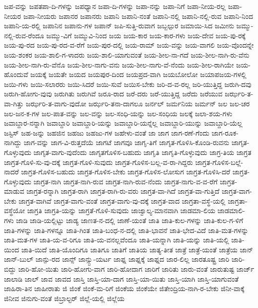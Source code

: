 {ಜಪ-ವನ್ನು
ಜಪತಪಾ-ದಿ-ಗಳನ್ನು
ಜಪಧ್ಯಾನ
ಜಪಾ-ದಿ-ಗಳನ್ನು
ಜಪಾ-ನನ್ನು
ಜಪಾ-ನಿಗೆ
ಜಪಾ-ನೀಯ-ರಲ್ಲ
ಜಪಾ-ನೀಯರ
ಜಪಾ-ನೀಯರು
ಜಪಾನರ
ಜಪಾನರು
ಜಪಾನಿ
ಜಪಾನಿ-ನಂತೆ
ಜಪಾನಿ-ನಲ್ಲಿ
ಜಪಾನಿ-ನಲ್ಲಿ-ರುವ
ಜಪಾನಿ-ನಿಂದ
ಜಪಾನಿ-ಯ-ರಲ್ಲಿ
ಜಪಾನಿನ
ಜಪಾನು-ಗಳ
ಜಪಾನ್
ಜಪಿ-ಸುತ್ತಿ-ರುವಾಗ
ಜಬ್ಬಲ್ಪುರ
ಜಮಾಯಿ-ಸಿದ
ಜಮೀನು
ಜಮ್ಮು-ನಲ್ಲಿ-ರುವ-ರೆಂದೂ
ಜಮ್ಮು-ವಿಗೆ
ಜಮ್ಮುವಿ-ನಿಂದ
ಜಯ
ಜಯ-ಕಾರ
ಜಯ-ಕಾರ-ಗಳು
ಜಯ-ದೇವ
ಜಯ-ಪು-ರಕ್ಕೆ
ಜಯ-ಪು-ರದ
ಜಯ-ಪು-ರದ-ವ-ರೆಗೆ
ಜಯ-ಪುರ-ದಲ್ಲಿ
ಜಯ-ರಾಮ್
ಜಯ-ವನ್ನು
ಜಯ-ವಾಗಲಿ
ಜಯ-ವೊಂದನ್ನೇ
ಜಯ-ಶಂಕರ
ಜಯ-ಶಾಲಿ-ಗ-ಳಾದರು
ಜಯ-ಶಾಲಿ-ಯಾಗುವಂತೆ
ಜಯ-ಶೀಲ-ನಾ-ಗದೆ
ಜಯ-ಶೀಲ-ನಾಗಿ-ರು-ವೆನು
ಜಯ-ಶೀಲ-ನಾಗಿ-ರು-ವೆನೊ
ಜಯ-ಶೀಲ-ನಾಗು-ವನು
ಜಯ-ಶೀಲ-ನಾಗು-ವೆ-ನೆಂದು
ಜಯ-ಶೀಲ-ರಾಗಿಯೇ
ಜಯ-ಹೊಂದುವೆ
ಜಯಕ್ಕೆ
ಜಯತೇ
ಜಯದ
ಜಯಪುರ-ದಿಂದ
ಜಯಪ್ರದ-ವಾಗಿ
ಜಯಬೋಲೋ
ಜಯಾಪಜಯ-ಗಳಲ್ಲಿ
ಜಯಿ-ಗಳು
ಜಯಿ-ಸಲಾರರು
ಜಯಿ-ಸಿದರೆ
ಜಯಿ-ಸುವೆ
ಜಯಿಸ-ಬೇಕು
ಜರಿ-ದ-ವ-ರಲ್ಲ
ಜರಿ-ಯುತ್ತಿದ್ದ
ಜರುಗಿ-ದವು
ಜರುಗಿ-ಹೋಗು-ವುವು
ಜರುಗಿತು
ಜರುಗಿವೆ
ಜರೂ-ರಾದ
ಜರೆ-ದರು
ಜರೆ-ಯುತ್ತಿದ್ದ
ಜರೆದು
ಜರೆಯುವ
ಜರ್ಝರಿ-ತ-ವಾ-ಗಿತ್ತು
ಜರ್ಝರಿ-ತ-ವಾಗು-ವುದೋ
ಜರ್ಝರಿ-ತನಾ-ದಾಗಲೂ
ಜರ್ನಲ್
ಜರ್ಮನಿಯ
ಜರ್ಮನ್
ಜಲ
ಜಲ-ಚರ
ಜಲ-ಜನ-ಕ-ಗಳ
ಜಲ-ಪಾತ-ವನ್ನು
ಜಲ-ವನ್ನು
ಜಲ-ಸಂಧಿ-ಯನ್ನು
ಜಲ-ಸಂಧಿಯ
ಜಲಕ್ಕೆ
ಜಲಾ-ಶಯ-ಗಳು
ಜವಾಬ್ದಾರ-ನನ್ನಾಗಿ
ಜವಾಬ್ದಾರಿ
ಜವಾಬ್ದಾರಿ-ಯನ್ನು
ಜವಾಬ್ದಾರಿ-ಯನ್ನೆಲ್ಲ
ಜವಾಬ್ದಾರಿ-ಯುನ್ನು
ಜವಾಬ್ದಾರಿ-ಯೆಲ್ಲ
ಜಸ್ಟಿಸ್
ಜಹ-ಜನ್ನು
ಜಹಜಿನ
ಜಹಜು
ಜಹಜು-ಗಳ
ಜಹೇಳು-ವಂತೆ
ಜಾ
ಜಾಗ
ಜಾಗ-ರಣೆ-ಗೆಂದು
ಜಾಗ-ರೂಕ-ನಾಗಿದ್ದು
ಜಾಗ-ವನ್ನು
ಜಾಗ-ವಿ-ರುತ್ತದೆಯೆ
ಜಾಗಟೆ
ಜಾಗವೂ
ಜಾಗೃ-ತಿಗೆ
ಜಾಗೃತ-ಗೊಳಿಸಿ-ಕೊಂಡಿ-ರುವನು
ಜಾಗೃತ-ಗೊಳ್ಳುವುದು
ಜಾಗೃತ-ವಾಗು-ವುದೆಂದು
ಜಾಗೃತಗೊಳಿಸ-ಬಹುದು
ಜಾಗೃತಿ
ಜಾಗೃತಿ-ಗೊಳ್ಳುವುದು
ಜಾಗ್ರ-ತಿಯ
ಜಾಗ್ರತ
ಜಾಗ್ರತ-ಗೊಳಿ-ಸು-ವು-ದಕ್ಕೆ
ಜಾಗ್ರತ-ಗೊಳಿ-ಸುವುದು
ಜಾಗ್ರತ-ಗೊಳಿಸ-ಬಲ್ಲ-ವ-ರಾ-ಗಿದ್ದರು
ಜಾಗ್ರತ-ಗೊಳಿಸ-ಬಲ್ಲೆ-ನಾದರೆ
ಜಾಗ್ರತ-ಗೊಳಿಸ-ಬಹುದು
ಜಾಗ್ರತ-ಗೊಳಿಸ-ಬೇಕು
ಜಾಗ್ರತ-ಗೊಳಿಸ-ಲೋಸುಗ
ಜಾಗ್ರತ-ಗೊಳಿಸಿ-ದರೆ
ಜಾಗ್ರತ-ಗೊಳ್ಳುವುದು
ಜಾಗ್ರತ-ನಾಗಿ
ಜಾಗ್ರತ-ನಾಗಿ-ರುವ
ಜಾಗ್ರತ-ನಾಗಿ-ರುವ-ನೆಂದು
ಜಾಗ್ರತ-ನಾಗು-ವ-ವ-ರೆಗೆ
ಜಾಗ್ರತ-ಮಾಡುವ
ಜಾಗ್ರತ-ರನ್ನಾಗಿ
ಜಾಗ್ರತ-ರಾಗಿ
ಜಾಗ್ರತ-ರಾಗಿ-ರು-ವರು
ಜಾಗ್ರತ-ವಾ-ಗಿದೆ
ಜಾಗ್ರತ-ವಾ-ಗುತ್ತಿದೆ
ಜಾಗ್ರತ-ವಾಗ-ಬೇಕು
ಜಾಗ್ರತ-ವಾಗಿವೆ
ಜಾಗ್ರತ-ವಾಗು-ವಂತೆ
ಜಾಗ್ರತ-ವಾಗು-ವು-ದಕ್ಕೆ
ಜಾಗ್ರತ-ವಾದ
ಜಾಗ್ರತಾ-ವಸ್ಥೆ-ಯಲ್ಲಿ
ಜಾಗ್ರತಾ-ವಸ್ಥೆಯೋ
ಜಾಗ್ರತಿ
ಜಾಗ್ರತಿ-ಯನ್ನು
ಜಾಗ್ರತೆ-ಗೊಳಿ-ಸುವುದು
ಜಾಜ್ವಾಲ್ಯ-ಮಾನವಾಗಿ
ಜಾಡಮಾ-ಲಿಯ
ಜಾಡಮಾಲಿ-ಗಳು
ಜಾಡಿ
ಜಾಡಿ-ಯಲ್ಲಿಟ್ಟು
ಜಾಡ್ಯ
ಜಾಣತ-ನ-ದಲ್ಲಿ
ಜಾಣೆ-ಯಂತೆ
ಜಾತಿ
ಜಾತಿ-ಕುಲ-ಗಳನ್ನು
ಜಾತಿ-ಕುಲ-ಗ-ಳಿಗೆ
ಜಾತಿ-ಗಳನ್ನು
ಜಾತಿ-ಗಳನ್ನೂ
ಜಾತಿ-ಗಿಂತ
ಜಾತಿ-ಬಂಧ-ನ-ದಲ್ಲಿ
ಜಾತಿ-ಭಾವನೆ
ಜಾತಿ-ಭೇದ-ವಿದೆ
ಜಾತಿ-ಮತ-ಗಳನ್ನು
ಜಾತಿ-ಮತ-ಗಳ
ಜಾತಿ-ಯ-ವ-ರಿಗೂ
ಜಾತಿ-ಯ-ವನಲ್ಲವೆಂದೂ
ಜಾತಿ-ಯನ್ನಾಗಿ
ಜಾತಿ-ಯನ್ನು
ಜಾತಿ-ಯಲ್ಲಿ
ಜಾತಿ-ಯಿಂದ
ಜಾತಿ-ಯಿದೆ
ಜಾತಿ-ಯೊಂದಿಗೂ
ಜಾತಿಗೂ
ಜಾತಿಗೆ
ಜಾತಿಯ
ಜಾತ್ಯ-ತೀತ
ಜಾತ್ರೆ
ಜಾತ್ರೆ-ಯಂತೆ
ಜಾತ್ರೆಯ
ಜಾನ್
ಜಾನ್-ಬುಲ್
ಜಾನ್ಪು-ರದ
ಜಾನ್ಸ್
ಜಾನ್ಸ್ಟು-ಯರ್ಟ
ಜಾಫ್ನ
ಜಾಫ್ನಕ್ಕೆ
ಜಾಫ್ನದ
ಜಾರ-ಲಿಲ್ಲ
ಜಾರತೂಷ್ಟ್ರ
ಜಾರಿ
ಜಾರಿ-ಬಿದ್ದು
ಜಾರಿ-ಹೋ-ಯಿತು
ಜಾರಿ-ಹೋಗು-ವಾಗ
ಜಾರಿ-ಹೋದಾಗ
ಜಾರಿಗೆ
ಜಾರಿತು
ಜಾರು-ವಂತೆ
ಜಾರುತುಷ್ಟ
ಜಾರ್ಜ್
ಜಾಲಾಡಿ
ಜಾಲ್
ಜಾವ
ಜಾವದ
ಜಾಸ್ತಿ
ಜಾಸ್ತಿ-ಯಾ-ದಾಗ
ಜಾಸ್ತಿ-ಯಾ-ಯಿತು
ಜಾಸ್ತಿ-ಯಾಗಿ
ಜಾಸ್ತಿ-ಯಾಗುವಂತೆ
ಜಾಹಿರಾ-ತಿನ
ಜಾಹೀರಾತು
ಜಿ
ಜಿಂಕೆ
ಜಿಂಕೆ-ಮ-ರಿಗೆ
ಜಿಂಕೆಯ
ಜಿಂಕೆಯೇ
ಜಿತೇಂದ್ರಿಯ-ನಾಗಿ-ರ-ಬೇಕು
ಜಿನೀ-ವಾಕ್ಕೆ
ಜಿನೀವ
ಜಿನುಗು-ವಂತೆ
ಜಿಬ್ರಾಲ್ಟರ್
ಜಿಲ್ಲೆ-ಯಲ್ಲಿ
ಜಿಲ್ಲೆಯ
}
